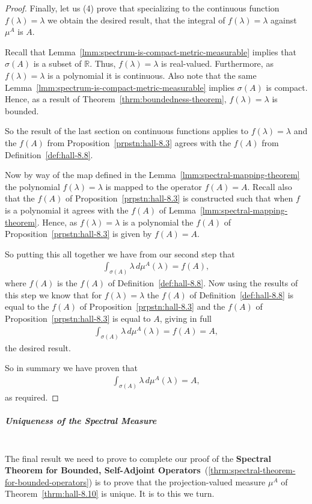 \begin{proof}
Finally, let us (4) prove that specializing to the continuous function $f(\lambda) = \lambda$ we obtain the desired result, that the integral of $f(\lambda) = \lambda$ against $\mu^A$ is $A$.

Recall that Lemma~\ref{lmm:spectrum-is-compact-metric-measurable} implies that $\sigma(A)$ is a subset of $\mathbb{R}$. Thus, $f(\lambda) = \lambda$ is real-valued. Furthermore, as $f(\lambda) = \lambda$ is a polynomial it is continuous. Also note that the same Lemma~\ref{lmm:spectrum-is-compact-metric-measurable} implies $\sigma(A)$ is compact. Hence, as a result of Theorem~\ref{thrm:boundedness-theorem}, $f(\lambda) = \lambda$ is bounded.

So the result of the last section on continuous functions applies to $f(\lambda) = \lambda$ and the $f(A)$ from Proposition~\ref{prpstn:hall-8.3} agrees with the $f(A)$ from Definition~\ref{def:hall-8.8}.

Now by way of the map defined in the Lemma~\ref{lmm:spectral-mapping-theorem} the polynomial $f(\lambda) = \lambda$ is mapped to the operator $f(A) = A$. Recall also that the $f(A)$ of Proposition~\ref{prpstn:hall-8.3} is constructed such that when $f$ is a polynomial it agrees with the $f(A)$ of Lemma~\ref{lmm:spectral-mapping-theorem}. Hence, as $f(\lambda) = \lambda$ is a polynomial the $f(A)$ of Proposition~\ref{prpstn:hall-8.3} is given by $f(A) = A$.

So putting this all together we have from our second step that
\begin{align}
    \int_{\sigma(A)} \lambda \, d\mu^A(\lambda) = f(A),
\end{align}
where $f(A)$ is the $f(A)$ of Definition~\ref{def:hall-8.8}. Now using the results of this step we know that for $f(\lambda) = \lambda$ the $f(A)$ of Definition~\ref{def:hall-8.8} is equal to the $f(A)$ of Proposition~\ref{prpstn:hall-8.3} and the $f(A)$ of Proposition~\ref{prpstn:hall-8.3} is equal to $A$, giving in full
\begin{align}
    \int_{\sigma(A)} \lambda \, d\mu^A(\lambda) = f(A) = A,
\end{align}
the desired result.

So in summary we have proven that
\begin{align}
    \int_{\sigma(A)} \lambda \, d\mu^A(\lambda) = A,
\end{align}
as required.
\end{proof}

\subparagraph{Uniqueness of the Spectral Measure}\mbox{}\\
The final result we need to prove to complete our proof of the \textbf{Spectral Theorem for Bounded, Self-Adjoint Operators}~(\ref{thrm:spectral-theorem-for-bounded-operators}) is to prove that the projection-valued measure $\mu^A$ of Theorem~\ref{thrm:hall-8.10} is unique. It is to this we turn.

